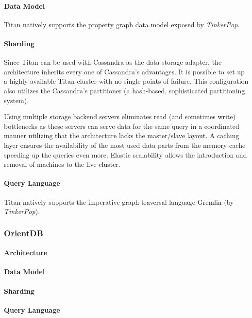 \paragraph{Data Model}
Titan natively supports the property graph data model exposed by \emph{TinkerPop}.

\paragraph{Sharding}
Since Titan can be used with Cassandra as the data storage adapter, the architecture inherits every one of Cassandra's advantages. It is possible to set up a highly available Titan cluster with no single points of failure. This configuration also utilizes the Cassandra's partitioner (a hash-based, sophisticated partitioning system).

Using multiple storage backend servers eliminates read (and sometimes write) bottlenecks as these servers can serve data for the same query in a coordinated manner utilizing that the architecture lacks the master/slave layout. A caching layer ensures the availability of the most used data parts from the memory cache speeding up the queries even more. Elastic scalability allows the introduction and removal of machines to the live cluster.


\paragraph{Query Language}
Titan natively supports the imperative graph traversal language Gremlin (by \emph{TinkerPop}).


\subsubsection{OrientDB}
\label{sect:orientdb}
\paragraph{Architecture}
\paragraph{Data Model}
\paragraph{Sharding}
\paragraph{Query Language}


